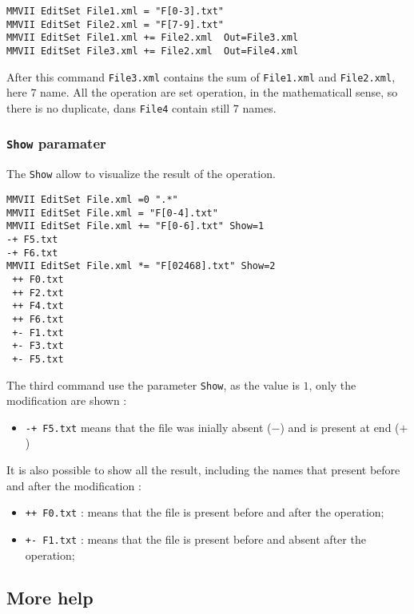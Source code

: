 \documentclass[a4paper]{book}
\begin{document}
{\begin{verbatim}
MMVII EditSet File1.xml = "F[0-3].txt"  
MMVII EditSet File2.xml = "F[7-9].txt"  
MMVII EditSet File1.xml += File2.xml  Out=File3.xml
MMVII EditSet File3.xml += File2.xml  Out=File4.xml
\end{verbatim}

After this command {\tt File3.xml} contains the sum of {\tt File1.xml} and {\tt File2.xml},
here $7$ name. All the operation are set operation, in the mathematicall sense, so there is
no duplicate, dans {\tt File4} contain still $7$ names.


\subsubsection{{\tt Show} paramater}

The {\tt Show} allow to visualize the result of the operation.

\begin{verbatim}
MMVII EditSet File.xml =0 ".*"
MMVII EditSet File.xml = "F[0-4].txt"
MMVII EditSet File.xml += "F[0-6].txt" Show=1
-+ F5.txt
-+ F6.txt
MMVII EditSet File.xml *= "F[02468].txt" Show=2
 ++ F0.txt
 ++ F2.txt
 ++ F4.txt
 ++ F6.txt
 +- F1.txt
 +- F3.txt
 +- F5.txt
\end{verbatim}

The third command use the parameter {\tt Show}, as the value is $1$,
only the modification are shown : 

\begin{itemize}
   \item {\tt -+ F5.txt} means that the file was inially absent ($-$) and is present at end ($+$)
\end{itemize}

It is also possible to show all the result, including the names that
present before and after the modification :

\begin{itemize}
   \item {\tt ++ F0.txt} : means that the file is present before and after the operation;
   \item {\tt +- F1.txt} : means that the file is present before and absent after the operation;
\end{itemize}



\subsection{More help}

}
\end{document}
